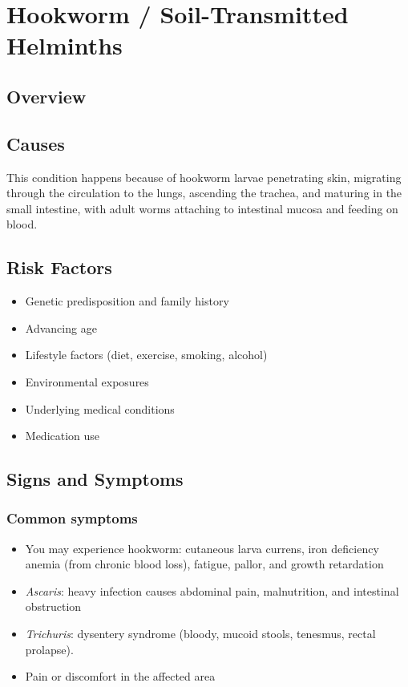 \chapter{Hookworm / Soil-Transmitted Helminths}
\label{sec:Hookworm Soil-Transmitted Helminths}

\section{Overview}

\section{Causes}
This condition happens because of hookworm larvae penetrating skin, migrating through the circulation to the lungs, ascending the trachea, and maturing in the small intestine, with adult worms attaching to intestinal mucosa and feeding on blood.     
\section{Risk Factors}

\begin{itemize}[noitemsep]
  \item Genetic predisposition and family history
  \item Advancing age
  \item Lifestyle factors (diet, exercise, smoking, alcohol)
  \item Environmental exposures
  \item Underlying medical conditions
  \item Medication use
\end{itemize}
\section{Signs and Symptoms}

\subsection{Common symptoms}
\begin{itemize}[noitemsep]
  \item You may experience hookworm: cutaneous larva currens, iron deficiency anemia (from chronic blood loss), fatigue, pallor, and growth retardation
  \item \textit{Ascaris}: heavy infection causes abdominal pain, malnutrition, and intestinal obstruction
  \item \textit{Trichuris}: dysentery syndrome (bloody, mucoid stools, tenesmus, rectal prolapse).
  \item Pain or discomfort in the affected area
  \end{itemize}

